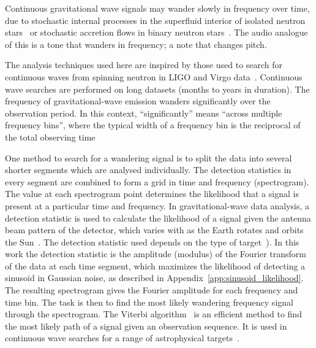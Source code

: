 \documentclass[paper-main.tex]{subfiles}
\begin{document}
 
Continuous gravitational wave signals may wander slowly in frequency over time, due to stochastic internal processes in the superfluid interior of isolated neutron stars~\cite{MelatosDouglassSimula:2015,Jones:2010} or stochastic accretion flows in binary neutron stars~\cite{BildstenTB:1998}. 
The audio analogue of this is a tone that wanders in frequency; a note that changes pitch. 


The analysis techniques used here are inspired by those used to search for continuous waves from spinning neutron in LIGO and Virgo data~\cite{SuvorovaEtAl:2016,SuvorovaEtAl:2017}.
Continuous wave searches are performed on long datasets (months to years in duration). 
The frequency of gravitational-wave emission wanders significantly over the observation period. 
In this context, ``significantly'' means ``across multiple frequency bins'', where the typical width of a frequency bin is the reciprocal of the total observing time~\cite{JKS:1998,ScoX1O2Viterbi:2019}

One method to search for a wandering signal is to split the data into several shorter segments which are analysed individually. 
The detection statistics in every segment are combined to form a grid in time and frequency (spectrogram). 
The value at each spectrogram point determines the likelihood that a signal is present at a particular time and frequency. 
In gravitational-wave data analysis, a detection statistic is used to calculate the likelihood of a signal given the antenna beam pattern of the detector, which varies with as the Earth rotates and orbits the Sun~\cite{JKS:1998}.
The detection statistic used depends on the type of target~\cite{JKS:1998,SuvorovaEtAl:2017}). 
In this work the detection statistic is the amplitude (modulus) of the Fourier transform of the data at each time segment, which maximizes the likelihood of detecting a sinusoid in Gaussian noise, as described in Appendix~\ref{app:sinusoid_likelihood}. 
The resulting spectrogram gives the Fourier amplitude for each frequency and time bin. 
The task is then to find the most likely wandering frequency signal through the spectrogram. 
The Viterbi algorithm~\cite{Viterbi:1967} is an efficient method to find the most likely path of a signal given an observation sequence. 
It is used in continuous wave searches for a range of astrophysical targets~\cite{ScoX1O2Viterbi:2019,ScoX1ViterbiO1:2017,MillhouseStrangMelatos:2020,PostMergerRemnantSearch:2019,SunEtAlSNR:2018,viterbi_application}. 
 
\end{document}
